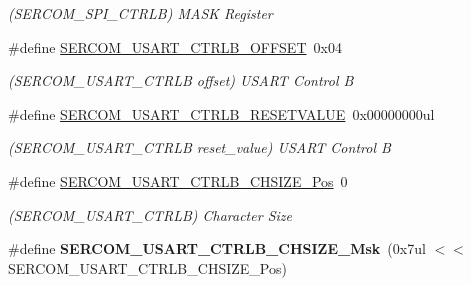 \begin{DoxyCompactItemize}
\begin{DoxyCompactList}\small\item\em (S\+E\+R\+C\+O\+M\+\_\+\+S\+P\+I\+\_\+\+C\+T\+R\+L\+B) M\+A\+S\+K Register \end{DoxyCompactList}\item 
\hypertarget{group___s_a_m_l21___s_e_r_c_o_m_ga39d423f1264e65f28f0e8e343a2e4173}{}\#define \hyperlink{group___s_a_m_l21___s_e_r_c_o_m_ga39d423f1264e65f28f0e8e343a2e4173}{S\+E\+R\+C\+O\+M\+\_\+\+U\+S\+A\+R\+T\+\_\+\+C\+T\+R\+L\+B\+\_\+\+O\+F\+F\+S\+E\+T}~0x04\label{group___s_a_m_l21___s_e_r_c_o_m_ga39d423f1264e65f28f0e8e343a2e4173}

\begin{DoxyCompactList}\small\item\em (S\+E\+R\+C\+O\+M\+\_\+\+U\+S\+A\+R\+T\+\_\+\+C\+T\+R\+L\+B offset) U\+S\+A\+R\+T Control B \end{DoxyCompactList}\item 
\hypertarget{group___s_a_m_l21___s_e_r_c_o_m_ga5f96cd1e2c3802c55743228fabc524cc}{}\#define \hyperlink{group___s_a_m_l21___s_e_r_c_o_m_ga5f96cd1e2c3802c55743228fabc524cc}{S\+E\+R\+C\+O\+M\+\_\+\+U\+S\+A\+R\+T\+\_\+\+C\+T\+R\+L\+B\+\_\+\+R\+E\+S\+E\+T\+V\+A\+L\+U\+E}~0x00000000ul\label{group___s_a_m_l21___s_e_r_c_o_m_ga5f96cd1e2c3802c55743228fabc524cc}

\begin{DoxyCompactList}\small\item\em (S\+E\+R\+C\+O\+M\+\_\+\+U\+S\+A\+R\+T\+\_\+\+C\+T\+R\+L\+B reset\+\_\+value) U\+S\+A\+R\+T Control B \end{DoxyCompactList}\item 
\hypertarget{group___s_a_m_l21___s_e_r_c_o_m_ga90b481f2faa23fa9beea38ee7dcce94d}{}\#define \hyperlink{group___s_a_m_l21___s_e_r_c_o_m_ga90b481f2faa23fa9beea38ee7dcce94d}{S\+E\+R\+C\+O\+M\+\_\+\+U\+S\+A\+R\+T\+\_\+\+C\+T\+R\+L\+B\+\_\+\+C\+H\+S\+I\+Z\+E\+\_\+\+Pos}~0\label{group___s_a_m_l21___s_e_r_c_o_m_ga90b481f2faa23fa9beea38ee7dcce94d}

\begin{DoxyCompactList}\small\item\em (S\+E\+R\+C\+O\+M\+\_\+\+U\+S\+A\+R\+T\+\_\+\+C\+T\+R\+L\+B) Character Size \end{DoxyCompactList}\item 
\hypertarget{group___s_a_m_l21___s_e_r_c_o_m_gafaa677a5d49f8fc8912907e164f03dab}{}\#define {\bfseries S\+E\+R\+C\+O\+M\+\_\+\+U\+S\+A\+R\+T\+\_\+\+C\+T\+R\+L\+B\+\_\+\+C\+H\+S\+I\+Z\+E\+\_\+\+Msk}~(0x7ul $<$$<$ S\+E\+R\+C\+O\+M\+\_\+\+U\+S\+A\+R\+T\+\_\+\+C\+T\+R\+L\+B\+\_\+\+C\+H\+S\+I\+Z\+E\+\_\+\+Pos)\label{group___s_a_m_l21___s_e_r_c_o_m_gafaa677a5d49f8fc8912907e164f03dab}


\end{DoxyCompactItemize}
